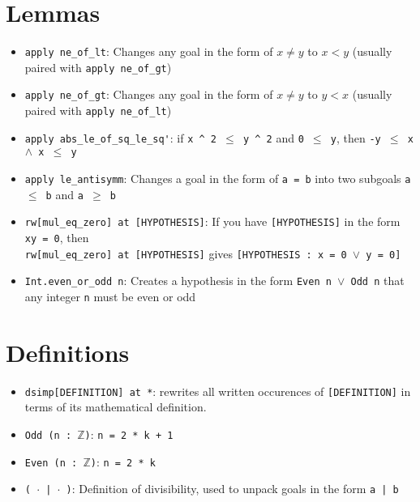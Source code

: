 \documentclass{exam}
\newcommand{\ZZ}{\mathbb Z}
\begin{document}
    \section*{Lemmas}
    \begin{itemize}
        \item \verb|apply ne_of_lt|: Changes any goal in the form of $x \neq y$ to $x < y$ (usually paired with \verb|apply ne_of_gt|)
        \item \verb|apply ne_of_gt|: Changes any goal in the form of $x \neq y$ to $y < x$ (usually paired with \verb|apply ne_of_lt|)
        \item \verb|apply abs_le_of_sq_le_sq'|: if \texttt{x \^{} 2 $\leq$ y \^{} 2} and \texttt{0 $\leq$ y}, then \texttt{-y $\leq$ x $\land$ x $\leq$ y}
        \item \verb|apply le_antisymm|: Changes a goal in the form of \texttt{a = b} into two subgoals \texttt{a $\leq$ b} and \texttt{a $\geq$ b}
        \item \verb|rw[mul_eq_zero] at [HYPOTHESIS]|: If you have \texttt{[HYPOTHESIS]} in the form \texttt{xy = 0}, then \\ \verb|rw[mul_eq_zero] at [HYPOTHESIS]| gives \texttt{[HYPOTHESIS : x = 0 $\lor$ y = 0]}
        \item \verb|Int.even_or_odd n|: Creates a hypothesis in the form \texttt{Even n $\lor$ Odd n} that any integer \texttt{n} must be even or odd
    \end{itemize}

    \section*{Definitions}
    \begin{itemize}
        \item \verb|dsimp[DEFINITION] at *|: rewrites all written occurences of \texttt{[DEFINITION]} in terms of its mathematical definition.
        \item \texttt{Odd (n : $\ZZ$)}: \texttt{n = 2 * k + 1}
        \item \texttt{Even (n : $\ZZ$)}: \texttt{n = 2 * k}
        \item \texttt{( $\cdot$ | $\cdot$ )}: Definition of divisibility, used to unpack goals in the form \texttt{a | b}
    \end{itemize}
\end{document}
